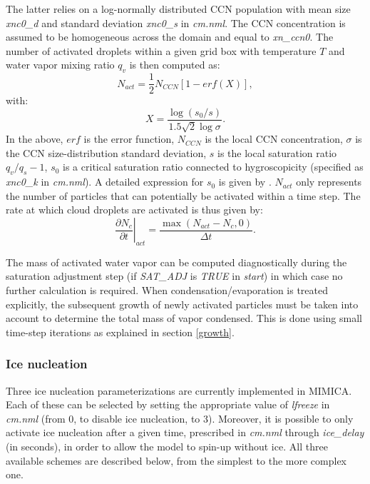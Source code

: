 \documentclass[12pt,A4,french]{article}
\begin{document}
The latter relies on a log-normally distributed CCN population with mean size {\it xnc0\_d} and standard deviation {\it xnc0\_s} in {\it cm.nml}. The CCN concentration is assumed to be homogeneous across the domain and equal to {\it xn\_ccn0}. The number of activated droplets within a given grid box with temperature $T$ and water vapor mixing ratio $q_v$ is then computed as:
\begin{equation}
    N_{act} = \frac{1}{2} N_{CCN} \left[1 - erf \left(X\right)\right],
\end{equation}
with:
\begin{equation}
    X = \frac{\log\left(s_0/s\right)}{1.5 \sqrt{2} \log \sigma}.
\end{equation}
In the above, $erf$ is the error function, $N_{CCN}$ is the local CCN concentration, $\sigma$ is the CCN size-distribution standard deviation, $s$ is the local saturation ratio $q_v/q_s - 1$, $s_0$ is a critical saturation ratio connected to hygroscopicity (specified as {\it xnc0\_k} in {\it cm.nml}). A detailed expression for $s_0$ is given by \cite{KC2006}. $N_{act}$ only represents the number of particles that can potentially be activated within a time step. The rate at which cloud droplets are activated is thus given by:
\begin{equation}
    \left.\frac{\partial N_c}{\partial t}\right|_{act} = \frac{\max(N_{act} - N_c,0)}{\Delta t}.\label{activ}
\end{equation}

The mass of activated water vapor can be computed diagnostically during the saturation adjustment step (if {\it SAT\_ADJ} is {\it TRUE} in {\it start}) in which case no further calculation is required. When condensation/evaporation is treated explicitly, the subsequent growth of newly activated particles must be taken into account to determine the total mass of vapor condensed. This is done using small time-step iterations as explained in section \ref{growth}. 

\subsubsection{Ice nucleation}
\label{icenuc}

Three ice nucleation parameterizations are currently implemented in MIMICA. Each of these can be selected by setting the appropriate value of {\it lfreeze} in {\it cm.nml} (from 0, to disable ice nucleation, to 3). Moreover, it is possible to only  activate ice nucleation after a given time, prescribed in {\it cm.nml} through {\it ice\_delay} (in seconds), in order to allow the model to spin-up without ice. All three available schemes are described below, from the simplest to the more complex one.
\end{document}
